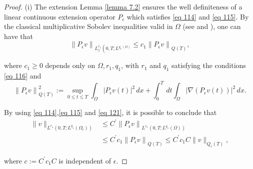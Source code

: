 \begin{proof}
(i) The extension Lemma \eqref{lemma 7.2} ensures the well definiteness of a linear continuous extension operator $P_{\epsilon}$ which satisfies \eqref{eq 114} and \eqref{eq 115}. By the classical multiplicative Sobolev inequalities valid in $\Omega$ (see \cite{Ladyzenskaja_Solonnikov_Uralceva_1968} and \cite{Nittka_2011}), one can have that
\begin{equation}
  \left\|P_{\epsilon} v\right\|_{L_{1}^{r_{1}}\left(0, T ; L^{q_{1}(\Omega)}\right.} \leq c_{1}\left\|P_{\epsilon} v\right\|_{Q(T)},
\label{eq 121}\end{equation}


where $c_{1} \geq 0$ depends only on $\Omega, r_{1}, q_{1}$, with $r_{1}$ and $q_{1}$ satisfying the conditions \eqref{eq 116} and
\begin{equation}
  \left\|P_{\epsilon} v\right\|_{Q(T)}^{2}:=\sup _{0 \leq t \leq T} \int_{\Omega}\left|P_{\epsilon} v(t)\right|^{2} \, d  x+\int_{0}^{T} \, d  t \int_{\Omega}\left|\nabla\left(P_{\epsilon} v(t)\right)\right|^{2} \, d  x.
\label{eq 122}\end{equation}

By using \eqref{eq 114},\eqref{eq 115} and \eqref{eq 121}, it is possible to conclude that
\begin{equation}
  \begin{aligned}
\|v\|_{L^{r_{1}}\left(0, T ; L^{q_{1}}\left(\Omega_{\epsilon}\right)\right)} & \leq C^{\prime}\left\|P_{\epsilon} v\right\|_{L^{r_{1}}\left(0, T ; L^{q_{1}}(\Omega)\right)} \\
& \leq C^{\prime} c_{1}\left\|P_{\epsilon} v\right\|_{Q(T)} \leq C^{\prime} c_{1} C\|v\|_{Q_{\epsilon}(T)},
\end{aligned}
\label{eq 123}\end{equation}


where $c:=C^{\prime} c_{1} C$ is independent of $\epsilon$.


\end{proof}
